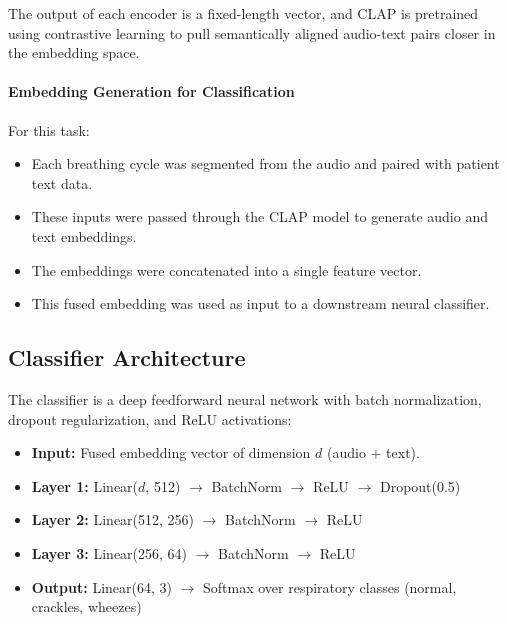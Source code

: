 The output of each encoder is a fixed-length vector, and CLAP is pretrained using contrastive learning to pull semantically aligned audio-text pairs closer in the embedding space.

\paragraph{Embedding Generation for Classification}
For this task:
\begin{itemize}
    \item Each breathing cycle was segmented from the audio and paired with patient text data.
    \item These inputs were passed through the CLAP model to generate audio and text embeddings.
    \item The embeddings were concatenated into a single feature vector.
    \item This fused embedding was used as input to a downstream neural classifier.
\end{itemize}

\subsection{Classifier Architecture}
The classifier is a deep feedforward neural network with batch normalization, dropout regularization, and ReLU activations:
\begin{itemize}
    \item \textbf{Input:} Fused embedding vector of dimension $d$ (audio + text).
    \item \textbf{Layer 1:} Linear($d$, 512) $\rightarrow$ BatchNorm $\rightarrow$ ReLU $\rightarrow$ Dropout(0.5)
    \item \textbf{Layer 2:} Linear(512, 256) $\rightarrow$ BatchNorm $\rightarrow$ ReLU
    \item \textbf{Layer 3:} Linear(256, 64) $\rightarrow$ BatchNorm $\rightarrow$ ReLU
    \item \textbf{Output:} Linear(64, 3) $\rightarrow$ Softmax over respiratory classes (normal, crackles, wheezes)
\end{itemize}


